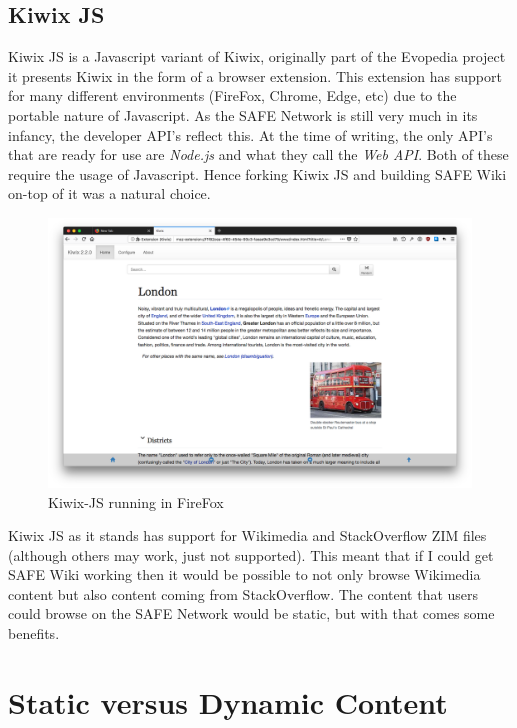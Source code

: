 \subsection{Kiwix JS}

Kiwix JS is a Javascript variant of Kiwix, originally part of the Evopedia project it presents Kiwix in the form of a browser extension. This extension has support for many different environments (FireFox, Chrome, Edge, etc) due to the portable nature of Javascript. As the SAFE Network is still very much in its infancy, the developer API's reflect this. At the time of writing, the only API's that are ready for use are \textit{Node.js} and what they call the \textit{Web API}. Both of these require the usage of Javascript. Hence forking Kiwix JS and building SAFE Wiki on-top of it was a natural choice.

\begin{figure}
	\begin{center}
			\includegraphics[width=\textwidth]{images/kiwix-js-extension}
		\caption{Kiwix-JS running in FireFox}
		\label{fig:kiwix-firefox}
	\end{center}
\end{figure}

Kiwix JS as it stands has support for Wikimedia and StackOverflow ZIM files (although others may work, just not supported). This meant that if I could get SAFE Wiki working then it would be possible to not only browse Wikimedia content but also content coming from StackOverflow. The content that users could browse on the SAFE Network would be static, but with that comes some benefits.

\section{Static versus Dynamic Content}

